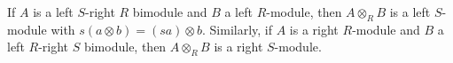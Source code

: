 If $A$ is a left $S$-right $R$ bimodule and $B$ a left $R$-module, then $A \otimes_R B$ is a left $S$-module with $s(a \otimes b) = (sa) \otimes b$. Similarly, if $A$ is a right $R$-module and $B$ a left $R$-right $S$ bimodule, then $A \otimes_R B$ is a right $S$-module.
